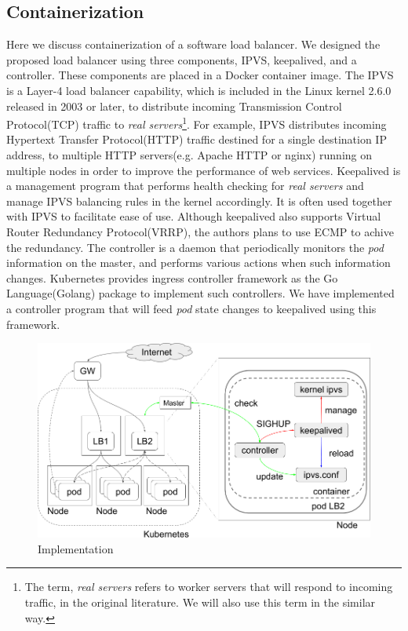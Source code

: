 \subsection{Containerization}\label{IPVS}

Here we discuss containerization of a software load balancer.
We designed the proposed load balancer using three components, IPVS, keepalived, and a controller. 
These components are placed in a Docker container image.
The IPVS is a Layer-4 load balancer capability, which is included in the Linux kernel 2.6.0 released in 2003 or later, 
to distribute incoming Transmission Control Protocol(TCP) traffic to 
{\em real servers}\footnote{The term, {\em real servers} refers to worker servers that will respond to incoming traffic, 
in the original literature\cite{Zhang2000}. We will also use this term in the similar way.}\cite{Zhang2000}. 
For example, IPVS distributes incoming Hypertext Transfer Protocol(HTTP) traffic destined for a single destination IP address, 
to multiple HTTP servers(e.g. Apache HTTP or nginx) running on multiple nodes in order to improve the performance of web services.
Keepalived is a management program that performs health checking for {\em real servers}
and manage IPVS balancing rules in the kernel accordingly.
It is often used together with IPVS to facilitate ease of use.
Although keepalived also supports Virtual Router Redundancy Protocol(VRRP)\cite{hinden2004virtual}, the authors plans to use ECMP to achive the redundancy.
The controller is a daemon that periodically monitors the {\em pod} information on the master, 
and performs various actions when such information changes.
Kubernetes provides ingress controller framework as the Go Language(Golang) package to implement such controllers. 
We have implemented a controller program that will feed {\em pod} state changes to keepalived 
using this framework. 

\begin{figure}
\includegraphics[width=\columnwidth]{Figs/ipvs-ingress-schem}
\caption{Implementation}
\label{fig:IPVS-ingress-schem}
\end{figure}


